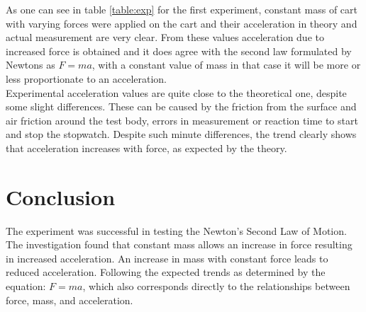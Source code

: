 \documentclass[a4paper,12pt]{article}
\begin{document}
As one can see in table \ref{table:exp} for the first experiment, constant mass of cart with varying forces were applied on the cart and their acceleration in theory and actual measurement are very clear. From these values acceleration due to increased force is obtained and it does agree with the second law formulated by Newtons as \( F = ma \), with a constant value of mass in that case it will be more or less proportionate to an acceleration. \\

Experimental acceleration values are quite close to the theoretical one, despite some slight differences. These can be caused by the friction from the surface and air friction around the test body, errors in measurement or reaction time to start and stop the stopwatch. Despite such minute differences, the trend clearly shows that acceleration increases with force, as expected by the theory.

\section{Conclusion}

The experiment was successful in testing the Newton's Second Law of Motion. The investigation found that constant mass allows an increase in force resulting in increased acceleration. An increase in mass with constant force leads to reduced acceleration. Following the expected trends as determined by the equation: \( F = ma \), which also corresponds directly to the relationships between force, mass, and acceleration.

\printbibliography
\end{document}
